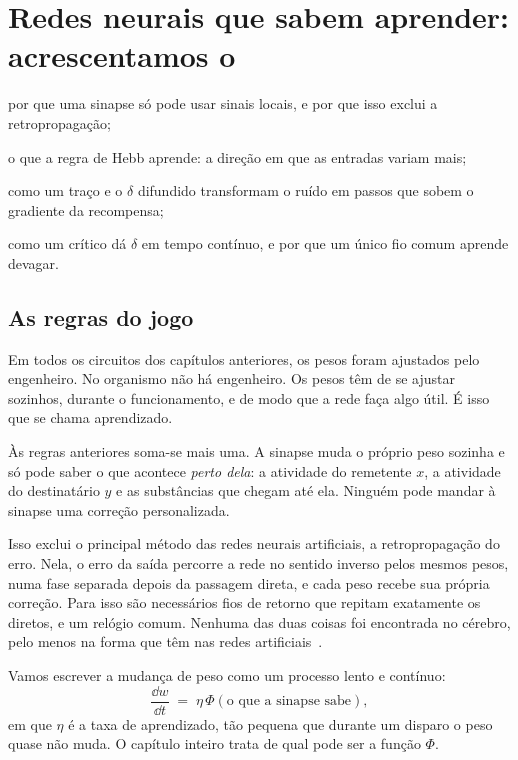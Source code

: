 \chapter{Redes neurais que sabem aprender: acrescentamos o }
\label{sec:dofa}
\begin{chaptergoals}
\item por que uma sinapse só pode usar sinais locais, e por que isso exclui a retropropagação;
\item o que a regra de Hebb aprende: a direção em que as entradas variam mais;
\item como um traço e o $\delta$ difundido transformam o ruído em passos que sobem o gradiente da recompensa;
\item como um crítico dá $\delta$ em tempo contínuo, e por que um único fio comum aprende devagar.
\end{chaptergoals}

\section{As regras do jogo}

Em todos os circuitos dos capítulos anteriores, os pesos foram ajustados pelo engenheiro. No organismo não há engenheiro. Os pesos têm de se ajustar sozinhos, durante o funcionamento, e de modo que a rede faça algo útil. É isso que se chama aprendizado.

Às regras anteriores soma-se mais uma. A sinapse muda o próprio peso sozinha e só pode saber o que acontece \emph{perto dela}: a atividade do remetente $x$, a atividade do destinatário $y$ e as substâncias que chegam até ela. Ninguém pode mandar à sinapse uma correção personalizada.

Isso exclui o principal método das redes neurais artificiais, a retropropagação do erro. Nela, o erro da saída percorre a rede no sentido inverso pelos mesmos pesos, numa fase separada depois da passagem direta, e cada peso recebe sua própria correção. Para isso são necessários fios de retorno que repitam exatamente os diretos, e um relógio comum. Nenhuma das duas coisas foi encontrada no cérebro, pelo menos na forma que têm nas redes artificiais~\cite{Lillicrap2020,WhittingtonBogacz2019}.

Vamos escrever a mudança de peso como um processo lento e contínuo:
\begin{equation}
\frac{\dd w}{\dd t} \;=\; \eta\,\Phi(\text{o que a sinapse sabe}),
\label{eq:plasticity}
\end{equation}
em que $\eta$ é a taxa de aprendizado, tão pequena que durante um disparo o peso quase não muda. O capítulo inteiro trata de qual pode ser a função $\Phi$.

